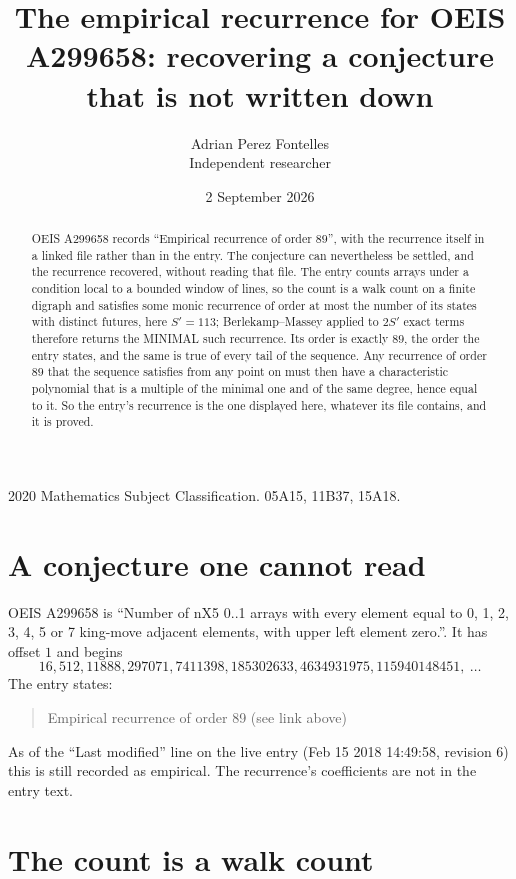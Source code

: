 \documentclass[11pt,a4paper]{article}
\title{The empirical recurrence for OEIS A299658: recovering a conjecture that is not written down}
\author{Adrian Perez Fontelles\\ \small Independent researcher}
\date{2 September 2026}
\theoremstyle{plain}
\theoremstyle{definition}
\begin{document}
\maketitle

\begin{abstract}
OEIS A299658 records ``Empirical recurrence of order $89$'', with the recurrence itself in a
linked file rather than in the entry. The conjecture can nevertheless be settled, and the
recurrence recovered, without reading that file. The entry counts arrays under a condition
local to a bounded window of lines, so the count is a walk count on a finite digraph and
satisfies some monic recurrence of order at most the number of its states with distinct
futures, here $S'=113$; Berlekamp--Massey applied to $2S'$ exact
terms therefore returns the MINIMAL such recurrence. Its order is exactly $89$, the order
the entry states, and the same is true of every tail of the sequence. Any recurrence of order
$89$ that the sequence satisfies from any point on must then have a characteristic
polynomial that is a multiple of the minimal one and of the same degree, hence equal to it. So
the entry's recurrence is the one displayed here, whatever its file contains, and it is
proved.
\end{abstract}

\noindent\small 2020 Mathematics Subject Classification. 05A15, 11B37, 15A18.\normalsize

\section{A conjecture one cannot read}

OEIS A299658 is ``Number of nX5 0..1 arrays with every element equal to 0, 1, 2, 3, 4, 5 or 7 king-move adjacent elements, with upper left element zero.''. It has offset $1$ and begins
\[
16, 512, 11888, 297071, 7411398, 185302633, 4634931975, 115940148451,\ \dots
\]
The entry states:
\begin{quote}
Empirical recurrence of order 89 (see link above)
\end{quote}
As of the ``Last modified'' line on the live entry (Feb 15 2018 14:49:58, revision 6) this is still
recorded as empirical. The recurrence's coefficients are not in the entry text.

\section{The count is a walk count}
\end{document}
